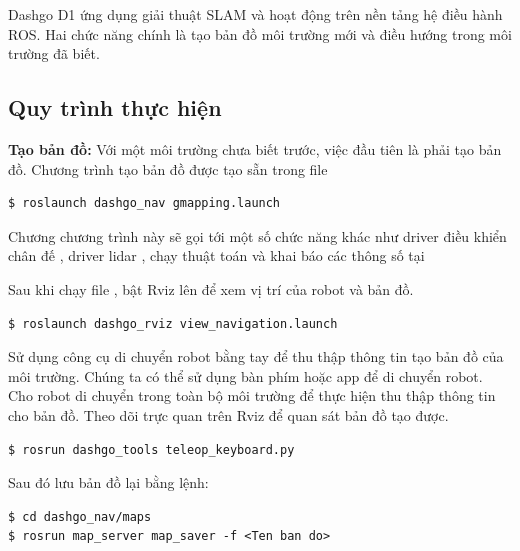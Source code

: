 Dashgo D1 ứng dụng giải thuật SLAM và hoạt động trên nền tảng hệ điều hành ROS.
Hai chức năng chính là tạo bản đồ môi trường mới và điều hướng trong môi trường đã biết.

\subsection{Quy trình thực hiện}

\textbf{Tạo bản đồ:} Với một môi trường chưa biết trước, việc đầu tiên là phải tạo bản đồ.
Chương trình tạo bản đồ được tạo sẵn trong file 

\begin{lstlisting}
$ roslaunch dashgo_nav gmapping.launch
\end{lstlisting}

Chương chương trình này sẽ gọi tới một số chức năng khác như driver điều khiển chân đế , driver lidar , chạy thuật toán và khai báo các thông số tại 

Sau khi chạy file , bật Rviz lên để xem vị trí của robot và bản đồ.
\begin{lstlisting}
$ roslaunch dashgo_rviz view_navigation.launch
\end{lstlisting}


Sử dụng công cụ di chuyển robot bằng tay để thu thập thông tin tạo bản đồ của môi trường. Chúng ta có thể sử dụng bàn phím hoặc app để di chuyển robot. Cho robot di chuyển trong toàn bộ môi trường để thực hiện thu thập thông tin cho bản đồ. Theo dõi trực quan trên Rviz để quan sát bản đồ tạo được.
\begin{lstlisting}
$ rosrun dashgo_tools teleop_keyboard.py
\end{lstlisting}

Sau đó lưu bản đồ lại bằng lệnh:
\begin{lstlisting}
$ cd dashgo_nav/maps
$ rosrun map_server map_saver -f <Ten ban do>
\end{lstlisting}

